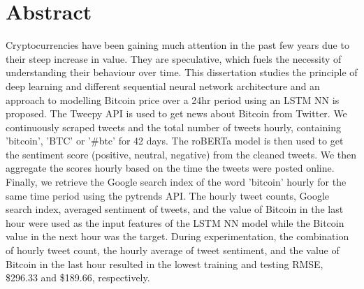 \documentclass[a4paper,12pt,hidelinks]{report}
\begin{document}
\chapter*{Abstract}
Cryptocurrencies have been gaining much attention in the past few years due to their steep increase in value. They are speculative, which fuels the necessity of understanding their behaviour over time. This dissertation studies the principle of deep learning and different sequential neural network architecture and an approach to modelling Bitcoin price over a 24hr period using an LSTM NN is proposed. The Tweepy API is used to get news about Bitcoin from Twitter. We continuously scraped tweets and the total number of tweets hourly, containing 'bitcoin', 'BTC' or '\#btc' for 42 days. The roBERTa model is then used to get the sentiment score (positive, neutral, negative) from the cleaned tweets. We then aggregate the scores hourly based on the time the tweets were posted online. Finally, we retrieve the Google search index of the word 'bitcoin' hourly for the same time period using the pytrends API. The hourly tweet counts, Google search index, averaged sentiment of tweets, and the value of Bitcoin in the last hour were used as the input features of the LSTM NN model while the Bitcoin value in the next hour was the target. During experimentation, the combination of hourly tweet count, the hourly average of tweet sentiment, and the value of Bitcoin in the last hour resulted in the lowest training and testing RMSE, \$296.33 and \$189.66, respectively.






\end{document}
